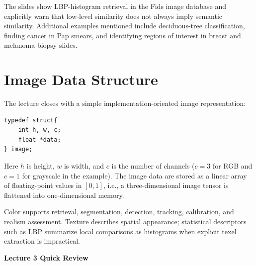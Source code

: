 \documentclass[11pt,a4paper,oneside]{report}
\begin{document}
The slides show LBP-histogram retrieval in the Fids image database and explicitly warn that low-level similarity does not always imply semantic similarity. Additional examples mentioned include deciduous-tree classification, finding cancer in Pap smears, and identifying regions of interest in breast and melanoma biopsy slides.

\section{Image Data Structure}

The lecture closes with a simple implementation-oriented image representation:\par
\begin{minipage}{\linewidth}
\begin{verbatim}
typedef struct{
    int h, w, c;
    float *data;
} image;
\end{verbatim}
\end{minipage}\par
Here $h$ is height, $w$ is width, and $c$ is the number of channels ($c=3$ for RGB and $c=1$ for grayscale in the example). The image data are stored as a linear array of floating-point values in $[0,1]$, i.e., a three-dimensional image tensor is flattened into one-dimensional memory.

\FloatBarrier
\begin{chaptersummary}
Color supports retrieval, segmentation, detection, tracking, calibration, and realism assessment. Texture describes spatial appearance; statistical descriptors such as LBP summarize local comparisons as histograms when explicit texel extraction is impractical.
\end{chaptersummary}

\par\vspace{1em}
{}
\begin{center}
{\sffamily\fontsize{22}{26}\selectfont\bfseries\color{Ink}Lecture 3 Quick Review\par}
\vspace{0.35em}{\color{SapienzaRed}\rule{0.82\textwidth}{0.8pt}}
\end{center}
\end{document}
